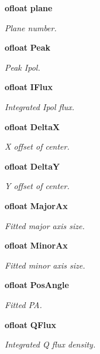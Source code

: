 \begin{CompactItemize}
{\bf ofloat} {\bf plane}
\begin{CompactList}\small\item\em Plane number. \item\end{CompactList}\item 
{\bf ofloat} {\bf Peak}
\begin{CompactList}\small\item\em Peak Ipol. \item\end{CompactList}\item 
{\bf ofloat} {\bf IFlux}
\begin{CompactList}\small\item\em Integrated Ipol flux. \item\end{CompactList}\item 
{\bf ofloat} {\bf Delta\-X}
\begin{CompactList}\small\item\em X offset of center. \item\end{CompactList}\item 
{\bf ofloat} {\bf Delta\-Y}
\begin{CompactList}\small\item\em Y offset of center. \item\end{CompactList}\item 
{\bf ofloat} {\bf Major\-Ax}
\begin{CompactList}\small\item\em Fitted major axis size. \item\end{CompactList}\item 
{\bf ofloat} {\bf Minor\-Ax}
\begin{CompactList}\small\item\em Fitted minor axis size. \item\end{CompactList}\item 
{\bf ofloat} {\bf Pos\-Angle}
\begin{CompactList}\small\item\em Fitted PA. \item\end{CompactList}\item 
{\bf ofloat} {\bf QFlux}
\begin{CompactList}\small\item\em Integrated Q flux density. \item\end{CompactList}\item 

\end{CompactItemize}
